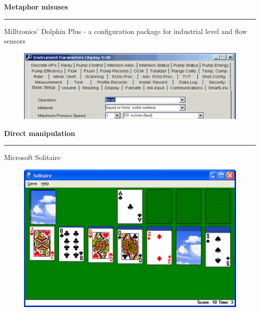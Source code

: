 \documentclass[pdf]{beamer}
\begin{document}
\begin{frame}
{\textbf{Metaphor misuses}}{\textcolor{red}{\rule{12cm}{1.2pt}}}

Milltronics' Dolphin Plus - a configuration package for industrial level and flow sensors
    \newline
    
\begin{figure}
\includegraphics[scale=0.45]{11_Picture1.png}
\end{figure}

\end{frame}



\begin{frame}
{\textbf{Direct manipulation}}{\textcolor{red}{\rule{12cm}{1.2pt}}}

Microsoft Solitaire

\begin{figure}
\includegraphics[scale=0.55]{2_Picture2.png}
\end{figure}
    
\text{ \fontsize{14}{10}\selectfont{"A subtle thing happens when everything is visible:} }\\ 	  
\text{ \fontsize{14}{10}\selectfont{the display becomes reality."}} \\
\hspace{180px}
\textit{ \fontsize{14}{10}\selectfont{Xerox Star inventors}} \\
    
\end{frame}
\end{document}
